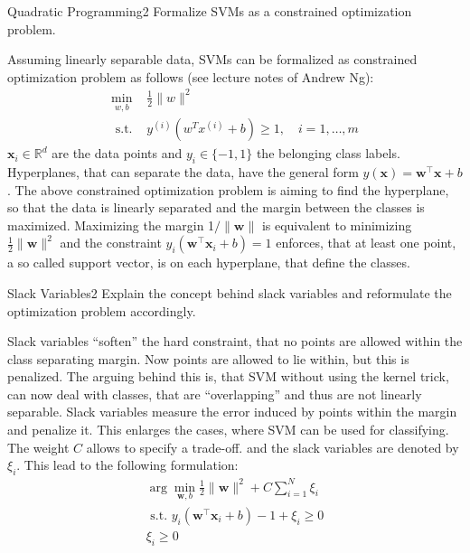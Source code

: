 \begin{questions}

\begin{question}{Quadratic Programming}{2}
Formalize SVMs as a constrained optimization problem.
\begin{answer}
Assuming linearly separable data, SVMs can be formalized as constrained optimization problem as follows
 (see lecture notes of Andrew Ng):
\begin{equation}
\begin{aligned} \min _{w, b} & \frac{1}{2}\|w\|^{2} \\ \text { s.t. } & y^{(i)}(w^{T} x^{(i)}+b) \geq 1, \quad i=1, \ldots, m \end{aligned}
\end{equation}
$\mathbf{x}_{i} \in \mathbb{R}^{d}$ are the data points and $y_{i} \in\{-1,1\}$ the belonging class labels. Hyperplanes, that can separate the data, have the general form $y(\mathbf{x})=\mathbf{w}^{\top} \mathbf{x}+b$. The above constrained optimization problem is aiming to find the hyperplane, so that the data is linearly separated and the margin between the classes is maximized. Maximizing the margin 1$/\|\mathbf{w}\|$ is equivalent to minimizing $\frac{1}{2}\|\mathbf{w}\|^{2}$ and the constraint $y_{i}(\mathbf{w}^{\top} \mathbf{x}_{i}+b)=1$ enforces, that at least one point, a so called support vector, is on each hyperplane, that define the classes.
\end{answer}
\end{question}


\begin{question}{Slack Variables}{2}
Explain the concept behind slack variables and reformulate the optimization problem accordingly. 
\begin{answer}
Slack variables ``soften'' the hard constraint, that no points are allowed within the class separating margin. Now points are allowed to lie within, but this is penalized. The arguing behind this is, that SVM without using the kernel trick, can now deal with classes, that are ``overlapping'' and thus are not linearly separable. Slack variables measure the error induced by points within the margin and penalize it. This enlarges the cases, where SVM can be used for classifying. The weight $C$ allows to specify a trade-off. and the slack variables are denoted by $\xi_{i}$. This lead to the following formulation:
\begin{equation}
\begin{array}{c}{\arg \min _{\mathbf{w}, b} \frac{1}{2}\|\mathbf{w}\|^{2}+C \sum_{i=1}^{N} \xi_{i}} \\ {\textrm { s.t. } y_{i}(\mathbf{w}^{\top} \mathbf{x}_{i}+b)-1+\xi_{i} \geq 0} \\ {\xi_{i} \geq 0}\end{array}
\end{equation}
\end{answer}
\end{question}



\end{questions}

